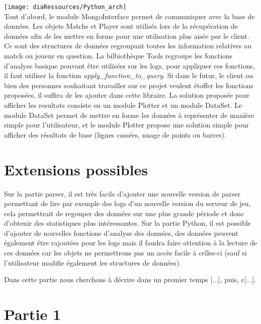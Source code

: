 \texttt{[image: diaRessources/Python\_arch]}\\

Tout d'abord, le module MongoInterface permet de communiquer avec la base de données.\newline
Les objets Matchs et Player sont utilisés lors de la récupération de données afin de les mettre en forme pour une utilisation plus aisée par le client. Ce sont des structures de données regroupant toutes les information relatives au match ou joueur en question.\newline
La bilbiothèque Tools regroupe les fonctions d'analyse basique pouvant être utilisées sur les logs, pour appliquer ces fonctions, il faut utiliser la fonction \textit{apply\_function\_to\_query}. Si dans le futur, le client ou bien des personnes souhaitant travailler sur ce projet veulent étoffer les fonctions proposées, il suffira de les ajouter dans cette libraire.\newline
La solution proposée pour afficher les resultats consiste en un module Plotter et un module DataSet. Le module DataSet permet de mettre en forme les données à représenter de manière simple pour l'utilisateur, et le module Plotter propose une solution simple pour afficher des résultats de base (lignes cassées, nuage de points ou barres).

\section{Extensions possibles}
Sur la partie parser, il est très facile d'ajouter une nouvelle version de parser permettant de lire par exemple des logs d'un nouvelle version du serveur de jeu, cela permettrait de regouper des données sur une plus grande période et donc d'obtenir des statistiques plus intéressantes.\newline
Sur la partie Python, il est possible d'ajouter de nouvelles fonctions d'analyse des données, des données peuvent également être rajoutées pour les logs mais il faudra faire attention à la lecture de ces données car les objets ne permettrons pas un accès facile à celles-ci (sauf si l'utilisateur modifie également les structures de données).

\iffalse
Dans cette partie nous cherchons à décrire dans un premier temps [...], puis, c[...].

\section{Partie 1}

